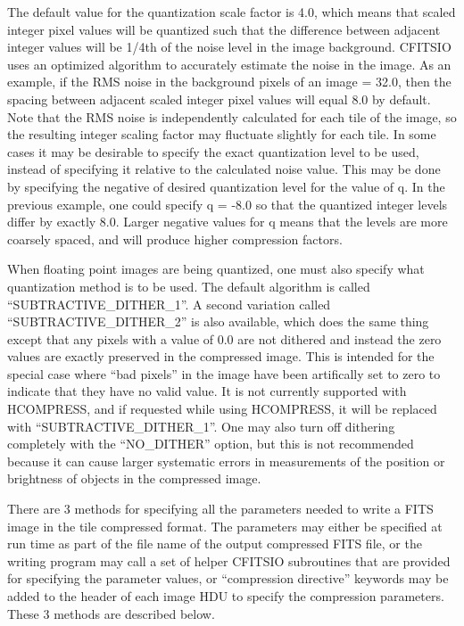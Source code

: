 \documentclass[11pt]{book}
\begin{document}
The default value for the quantization scale factor is 4.0, which means that
scaled integer pixel values will be quantized such that the difference
between adjacent integer values will be 1/4th of the noise level in the
image background. CFITSIO uses an optimized algorithm to accurately estimate
the noise in the image.  As an example, if the RMS noise in the background
pixels of an  image = 32.0,  then the spacing between adjacent scaled
integer pixel values  will equal 8.0 by default.  Note that the RMS noise is
independently calculated for each tile of the image, so the resulting
integer scaling factor may fluctuate slightly for each tile.   In some cases
it may be desirable to specify the exact quantization level to be used,
instead of specifying it relative to the calculated noise value.  This may
be done by specifying the negative of desired quantization level for the
value of q.  In the previous example, one could specify q = -8.0 so that the
quantized integer levels differ by exactly 8.0.  Larger negative values for q means
that the levels are more coarsely spaced, and will produce higher
compression factors.

When floating point images are being quantized, one must also specify what
quantization method is to be used.  The default algorithm is called
``SUBTRACTIVE\_DITHER\_1''.  A second variation called ``SUBTRACTIVE\_DITHER\_2''
is also available, which does the same thing except that any pixels with a
value of 0.0 are not dithered and instead the zero values are exactly
preserved in the compressed image.  This is intended for the special case
where ``bad pixels'' in the image have been artifically set to zero to indicate that they have no valid value.  It is not currently supported with HCOMPRESS, 
and if requested while using HCOMPRESS, it will be replaced with ``SUBTRACTIVE\_DITHER\_1''.  One may also turn off dithering
completely with the ``NO\_DITHER'' option, but this is not recommended
because it can cause larger systematic errors in measurements of the
position or brightness of objects in the compressed image.

There are 3 methods for specifying all the parameters needed to write a FITS
image in the tile compressed format.  The parameters may either be specified
at run time as part of the file name of the output compressed FITS file, or
the writing program may call a set of helper CFITSIO subroutines that are provided
for specifying the parameter values, or ``compression directive'' keywords
may be added to the header of each image HDU to specify the compression parameters.
These 3 methods are described below.
\end{document}
